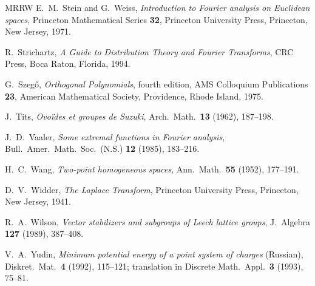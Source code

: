 \documentclass{jams-l}
\theoremstyle{plain}
\numberwithin{theorem}{section}
\theoremstyle{definition}
\numberwithin{equation}{section}
\begin{document}
\begin{thebibliography}{MRRW}
 E.~M.~Stein and G.~Weiss, \textit{Introduction to
Fourier analysis on Euclidean spaces\/}, Princeton Mathematical
Series \textbf{32}, Princeton University Press, Princeton, New
Jersey, 1971. 

 R.~Strichartz, \textit{A Guide to Distribution Theory
and Fourier Transforms\/}, CRC Press, Boca Raton, Florida, 1994.

 G.~Szeg\H o,
\textit{Orthogonal Polynomials\/}, fourth edition, AMS Colloquium
Publications \textbf{23}, American Mathematical Society,
Providence, Rhode Island, 1975. 

 J.~Tits, \textit{Ovo\"ides et groupes de Suzuki\/},
Arch.\ Math.\ {\bf 13} (1962), 187--198.

 J.~D.~Vaaler, \textit{Some extremal functions in Fourier
analysis\/}, Bull.\ Amer.\ Math.\ Soc.\ (N.S.) {\bf 12} (1985),
183--216.

 H.~C.~Wang, \textit{Two-point homogeneous spaces\/},
Ann.\ Math.\ {\bf 55} (1952), 177--191.

 D.~V.~Widder,
\textit{The Laplace Transform\/}, Princeton University Press, Princeton,
New Jersey, 1941.

 R.~A.~Wilson, \textit{Vector stabilizers and subgroups
of Leech lattice groups\/}, J.\ Algebra {\bf 127} (1989),
387--408.

 V.~A.~Yudin, \textit{Minimum potential energy of a
point system of charges\/} (Russian),
Diskret.\ Mat.\ \textbf{4} (1992), 115--121; translation in
Discrete Math.\ Appl.\ {\bf 3} (1993), 75--81.
\end{thebibliography}
\end{document}
